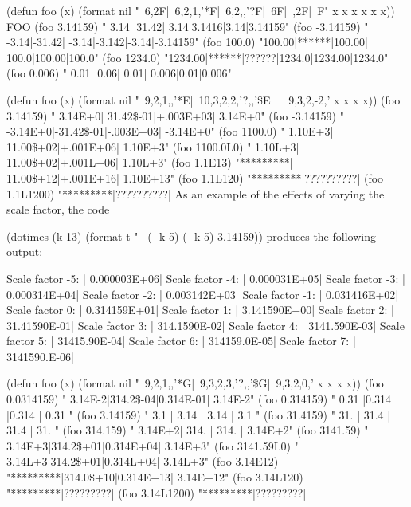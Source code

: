 \code
 (defun foo (x)
   (format nil "~6,2F|~6,2,1,'*F|~6,2,,'?F|~6F|~,2F|~F"
           x x x x x x)) \EV FOO
 (foo 3.14159)  \EV "  3.14| 31.42|  3.14|3.1416|3.14|3.14159"
 (foo -3.14159) \EV " -3.14|-31.42| -3.14|-3.142|-3.14|-3.14159"
 (foo 100.0)    \EV "100.00|******|100.00| 100.0|100.00|100.0"
 (foo 1234.0)   \EV "1234.00|******|??????|1234.0|1234.00|1234.0"
 (foo 0.006)    \EV "  0.01|  0.06|  0.01| 0.006|0.01|0.006"
\endcode

\code
 (defun foo (x)  
    (format nil
           "~9,2,1,,'*E|~10,3,2,2,'?,,'\$E|~
            ~9,3,2,-2,'%
           x x x x))
 (foo 3.14159)  \EV "  3.14E+0| 31.42\$-01|+.003E+03|  3.14E+0"
 (foo -3.14159) \EV " -3.14E+0|-31.42\$-01|-.003E+03| -3.14E+0"
 (foo 1100.0)   \EV "  1.10E+3| 11.00\$+02|+.001E+06|  1.10E+3"
 (foo 1100.0L0) \EV "  1.10L+3| 11.00\$+02|+.001L+06|  1.10L+3"
 (foo 1.1E13)   \EV "*********| 11.00\$+12|+.001E+16| 1.10E+13"
 (foo 1.1L120)  \EV "*********|??????????|%
 (foo 1.1L1200) \EV "*********|??????????|%
\endcode
As an example of the effects of varying the scale factor, the code

\code
 (dotimes (k 13)
   (format t "~%
           (- k 5) (- k 5) 3.14159))
\endcode
produces the following output:

\code
Scale factor -5: | 0.000003E+06|
Scale factor -4: | 0.000031E+05|
Scale factor -3: | 0.000314E+04|
Scale factor -2: | 0.003142E+03|
Scale factor -1: | 0.031416E+02|
Scale factor  0: | 0.314159E+01|
Scale factor  1: | 3.141590E+00|
Scale factor  2: | 31.41590E-01|
Scale factor  3: | 314.1590E-02|
Scale factor  4: | 3141.590E-03|
Scale factor  5: | 31415.90E-04|
Scale factor  6: | 314159.0E-05|
Scale factor  7: | 3141590.E-06|
\endcode


\code
 (defun foo (x)
   (format nil "~9,2,1,,'*G|~9,3,2,3,'?,,'\$G|~9,3,2,0,'%
          x x x x))                                     
 (foo 0.0314159) \EV "  3.14E-2|314.2\$-04|0.314E-01|  3.14E-2"
 (foo 0.314159)  \EV "  0.31   |0.314    |0.314    | 0.31    "
 (foo 3.14159)   \EV "   3.1   | 3.14    | 3.14    |  3.1    "
 (foo 31.4159)   \EV "   31.   | 31.4    | 31.4    |  31.    "
 (foo 314.159)   \EV "  3.14E+2| 314.    | 314.    |  3.14E+2"
 (foo 3141.59)   \EV "  3.14E+3|314.2\$+01|0.314E+04|  3.14E+3"
 (foo 3141.59L0) \EV "  3.14L+3|314.2\$+01|0.314L+04|  3.14L+3"
 (foo 3.14E12)   \EV "*********|314.0\$+10|0.314E+13| 3.14E+12"
 (foo 3.14L120)  \EV "*********|?????????|%
 (foo 3.14L1200) \EV "*********|?????????|%
\endcode


